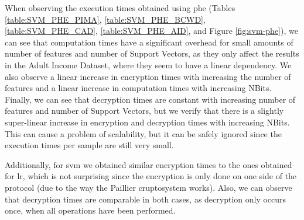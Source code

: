 When observing the execution times obtained using \ac{phe} (Tables \ref{table:SVM_PHE_PIMA}, \ref{table:SVM_PHE_BCWD}, \ref{table:SVM_PHE_CAD}, \ref{table:SVM_PHE_AID}, and Figure \ref{fig:svm-phe}), we can see that computation times have a significant overhead for small amounts of number of features and number of Support Vectors, as they only affect the results in the Adult Income Dataset, where they seem to have a linear dependency. 
We also observe a linear increase in encryption times with increasing the number of features and a linear increase in computation times with increasing NBits.
Finally, we can see that decryption times are constant with increasing number of features and number of Support Vectors, but we verify that there is a slightly super-linear increase in encryption and decryption times with increasing NBits. This can cause a problem of scalability, but it can be safely ignored since the execution times per sample are still very small.

Additionally, for \ac{svm} we obtained similar encryption times to the ones obtained for \ac{lr}, which is not surprising since the encryption is only done on one side of the protocol (due to the way the Paillier cruptosystem works). Also, we can observe that decryption times are comparable in both cases, as decryption only occurs once, when all operations have been performed.



